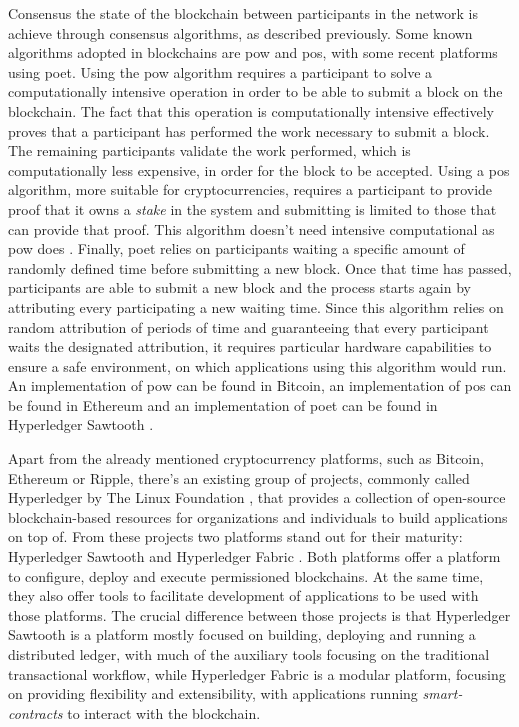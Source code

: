 Consensus the state of the blockchain between participants in the network is achieve through consensus algorithms, as described previously. Some known algorithms adopted in blockchains are \gls{pow} and \gls{pos}, with some recent platforms using \gls{poet}. Using the \gls{pow} algorithm requires a participant to solve a computationally intensive operation\cite{nakamoto_bitcoin:_2008, yaga_blockchain_2018} in order to be able to submit a block on the blockchain. The fact that this operation is computationally intensive effectively proves that a participant has performed the work necessary to submit a block. The remaining participants validate the work performed, which is computationally less expensive, in order for the block to be accepted. Using a \gls{pos} algorithm, more suitable for cryptocurrencies, requires a participant to provide proof that it owns a \emph{stake} in the system and submitting is limited to those that can provide that proof. This algorithm doesn't need intensive computational as \gls{pow} does \cite{yaga_blockchain_2018}. Finally, \gls{poet} relies on participants waiting a specific amount of randomly defined time before submitting a new block. Once that time has passed, participants are able to submit a new block and the process starts again by attributing every participating a new waiting time. Since this algorithm relies on random attribution of periods of time and guaranteeing that every participant waits the designated attribution, it requires particular hardware capabilities to ensure a safe environment, on which applications using this algorithm would run. An implementation of \gls{pow} can be found in Bitcoin, an implementation of \gls{pos} can be found in Ethereum and an implementation of \gls{poet} can be found in Hyperledger Sawtooth \cite{yaga_blockchain_2018}.

Apart from the already mentioned cryptocurrency platforms, such as Bitcoin, Ethereum or Ripple, there's an existing group of projects, commonly called Hyperledger \cite{hyperledger} by The Linux Foundation \cite{linuxfoundation}, that provides a collection of open-source blockchain-based resources for organizations and individuals to build applications on top of. From these projects two platforms stand out for their maturity: Hyperledger Sawtooth \cite{hyperledger_sawtooth} and Hyperledger Fabric \cite{hyperledger_fabric}. Both platforms offer a platform to configure, deploy and execute permissioned blockchains. At the same time, they also offer tools to facilitate development of applications to be used with those platforms. The crucial difference between those projects is that Hyperledger Sawtooth is a platform mostly focused on building, deploying and running a distributed ledger, with much of the auxiliary tools focusing on the traditional transactional workflow, while Hyperledger Fabric is a modular platform, focusing on providing flexibility and extensibility, with applications running \emph{smart-contracts} to interact with the blockchain.

